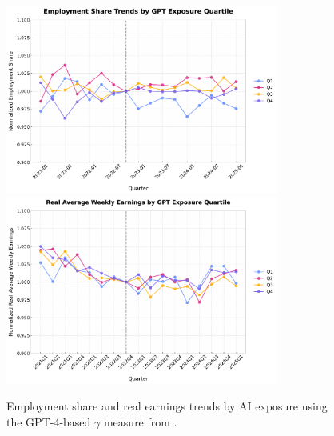 \documentclass[12pt]{article}
\numberwithin{equation}{section}
\theoremstyle{theorem}\newcustomtheorem{theorem}{{\bf\sc Theorem}}
\theoremstyle{definition}\newcustomtheorem{assumption}{{\bf\sc Assumption}}
\theoremstyle{theorem} \newcustomtheorem{proposition}{{\bf\sc Proposition}}
\begin{document}
\begin{figure}[htbp]
	\centering
  \includegraphics[width=0.8\textwidth]{../figures/employment_share_by_gpt4_gamma_quartile_2021Q1.pdf}
  \includegraphics[width=0.8\textwidth]{../figures/real_earnings_by_gpt4_gamma_quartile_2021Q1.pdf}
	\caption{Employment share and real earnings trends by AI exposure using the GPT-4-based $\gamma$ measure from \citet{eloundou_gpts_2024}.}
	\label{fig:employment_trends_gamma}
\end{figure}
\end{document}

